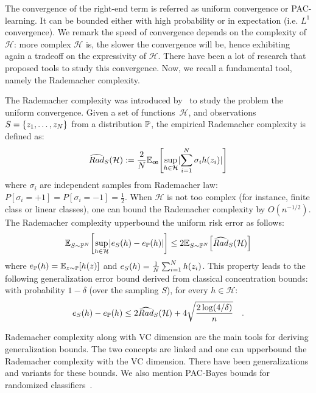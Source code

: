 The convergence of the right-end term is referred as uniform convergence or PAC-learning. It can be bounded either with high probability or in expectation (i.e. $L^1$ convergence). We remark the speed of convergence depends on the complexity of $\mathcal{H}$: more complex $\mathcal{H}$ is, the slower the convergence will be, hence exhibiting again a tradeoff on the expressivity of $\mathcal{H}$. There have been a  lot of research that proposed tools to study this convergence. Now, we recall a fundamental tool, namely the Rademacher complexity.


The Rademacher complexity was introduced by~\cite{bartlett2002rademacher} to study the problem the uniform convergence. Given a set of functions~$\mathcal{H}$, and observations $S=\{z_1,\dots,z_N\}$ from a distribution $\mathbb{P}$, the empirical Rademacher complexity is defined as:
\begin{align*}
    \widehat{Rad}_S(\mathcal{H}):=\frac2\numsamples\mathbb{E}_{\mathbf{\sigma}}\left[\sup_{h\in\mathcal{H}}\lvert\sum_{i=1}^\numsamples\sigma_i h(z_i)\rvert\right]
\end{align*}
where $\sigma_i$ are independent samples from Rademacher law: $P[\sigma_i =+1] = P[\sigma_i =-1]=\frac12$. When $\mathcal{H}$ is not too complex (for instance, finite class or linear classes), one can bound the Rademacher complexity  by $O(n^{-1/2})$. The Rademacher complexity upperbound the uniform risk error as follows:
\begin{align*}
    \mathbb{E}_{S\sim\PP^\numsamples}\left[\sup_{h\in\mathcal{H}}\lvert e_S(h)-e_\PP(h)\rvert\right]\leq 2\mathbb{E}_{S\sim\PP^\numsamples}\left[\widehat{Rad}_S(\mathcal{H})\right]
\end{align*}
where $e_\PP(h)=\mathbb{E}_{z\sim\PP}\left[h(z)\right]$ and $e_S(h)=\frac1{N} \sum_{i=1}^N h(z_i)$. This property leads to the following generalization error bound derived from classical concentration bounds: with probability $1-\delta$ (over the sampling $S$), for every $h\in \mathcal{H}$:
\begin{align*}
    e_S(h)-e_{\mathbb{P}}(h)\leq 2  \widehat{Rad}_S(\mathcal{H})+4\sqrt{\frac{2\log(4/\delta)}{n}}\quad.
\end{align*}


Rademacher complexity along with VC dimension are the main tools for deriving generalization bounds. The two concepts are linked and one can upperbound the Rademacher complexity with the VC dimension.  There have been generalizations and variants for these bounds. We also mention PAC-Bayes bounds for randomized classifiers~\cite{xxx}.



